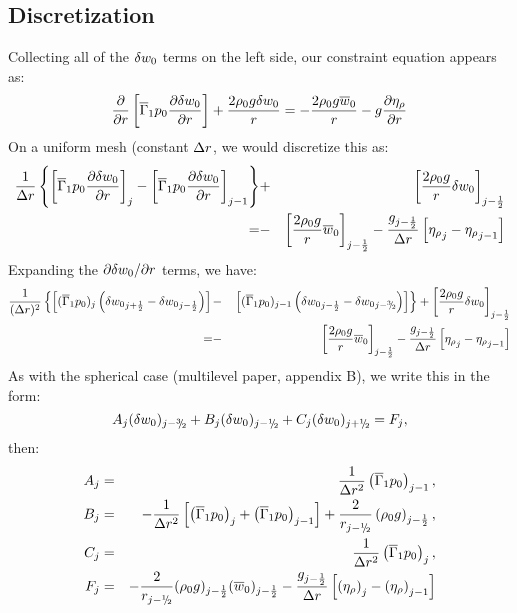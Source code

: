 \subsection{Discretization}

Collecting all of the $\delta w_0$ terms on the left side, our constraint equation
appears as:
\begin{equation}
\frac{\partial}{\partial r} \left [ \overline{\Gamma}_1 p_0 \frac{\partial \delta w_0}{\partial r} \right ]
 + \frac{2 \rho_0 g \delta w_0}{r} = -\frac{2 \rho_0 g \overline{w}_0}{r} - g \frac{\partial \eta_{\rho}}{\partial r}
\end{equation}
%
On a uniform mesh (constant $\Delta r$, we would discretize this as:
\begin{eqnarray}
\frac{1}{\Delta r} \left \{ \left [ \overline{\Gamma}_1 p_0 \frac{\partial \delta w_0}{\partial r} \right ]_j
                     - \left [ \overline{\Gamma}_1 p_0 \frac{\partial \delta w_0}{\partial r} \right ]_{j-1}
              \right \}
            &+& \left [ \frac{2 \rho_0 g}{r} \delta w_0 \right ]_{j-\frac{1}{2}} \nonumber \\
            = &-& \left [ \frac{2 \rho_0 g}{r} \overline{w}_0 \right ]_{j-\frac{1}{2}}
              - \frac{g_{j-\frac{1}{2}}}{\Delta r} \left [ {\eta_{\rho}}_j - {\eta_{\rho}}_{j-1} \right ]
\end{eqnarray}
Expanding the $\partial \delta w_0 / \partial r$ terms, we have:
\begin{eqnarray}
\frac{1}{(\dr)^2} \left \{ \left [ (\gammabar p_0)_j
                               \left ({\dw}_{j+\half} - {\dw}_{j-\half} \right ) \right ]
                      \right . &-& \left . \left [ (\gammabar p_0)_{j-1}
                               \left ({\dw}_{j-\half} - {\dw}_{j-\thalf} \right ) \right ]
              \right \}
            + \left [ \frac{2 \rho_0 g}{r} \dw \right ]_{j-\half} \nonumber \\
            = &-& \left [ \frac{2 \rho_0 g}{r} \ow \right ]_{j-\half}
              - \frac{g_{j-\half}}{\dr} \left [ {\etarho}_j - {\etarho}_{j-1} \right ]
\end{eqnarray}
As with the spherical case (multilevel paper, appendix B), we write this in the form:
\begin{equation}
A_j (\dw)_{j-\thalf} + B_j (\dw)_{j-\myhalf} + C_j (\dw)_{j+\myhalf} = F_j,
\end{equation}
then:
\begin{eqnarray}
A_j &=& \frac{1}{\Delta r^2} \left( {\gammabar p_0}\right)_{j-1}, \\
B_j &=& -\frac{1}{\Delta r^2} \left[ \left( {\gammabar p_0}\right)_{j}  + \left( {\gammabar p_0}\right)_{j-1} \right] +  \frac{2}{r_{j-\myhalf}} \left (\rho_0 g \right )_{j-\half}  , \\
C_j &=& \frac{1}{\Delta r^2} \left( {\gammabar p_0}\right)_{j}  , \\
F_j &=&  -\frac{2}{r_{j-\myhalf}} (\rho_0 g)_{j-\half}   (\ow)_{j-\half} - \frac{g_{j-\half}}{\Delta r} \left[ \left( \etarho \right)_{j} - \left( \etarho \right)_{j-1} \right] 
\end{eqnarray}


